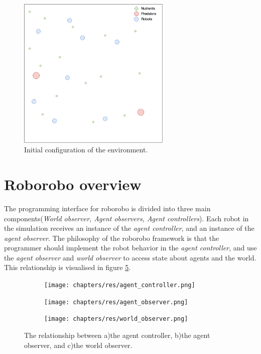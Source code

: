 \begin{figure}[H]
	
	\centering
	\includegraphics[width=0.65\textwidth]{chapters/res/Environment.png}
	\caption{Initial configuration of the environment.}
	\label{fig:environment}
\end{figure}

\section{Roborobo overview}
The programming interface for roborobo is divided into three main components(\emph{World observer, Agent observers, Agent controllers}).
Each robot in the simulation receives an instance of the \emph{agent controller}, and an instance of the \emph{agent observer}.
The philosophy of the roborobo framework is that the programmer should implement the robot behavior in the \emph{agent controller}, and use the \emph{agent observer} and \emph{world observer} to access state about agents and the world.
This relationship is visualised in figure \ref{fig:component-relationship}.

\begin{figure}[H]
	\centering
	\begin{subfigure}{0.31\textwidth}
		\label{fig:controller}
		\centering
		\hspace*{1.15cm}\texttt{[image: chapters/res/agent\_controller.png]}
		\caption{}
	\end{subfigure}
	\begin{subfigure}{0.31\textwidth}
		\label{fig:agent-observer}
		\centering
		\texttt{[image: chapters/res/agent\_observer.png]}
		\caption{}
	\end{subfigure}
	\begin{subfigure}{0.31\textwidth}
		\label{fig:world-observer}
		\centering
		\texttt{[image: chapters/res/world\_observer.png]}
		\caption{}
	\end{subfigure}
	\caption{The relationship between a)the agent controller, b)the agent observer, and c)the world observer. }
	\label{fig:component-relationship}
\end{figure}

